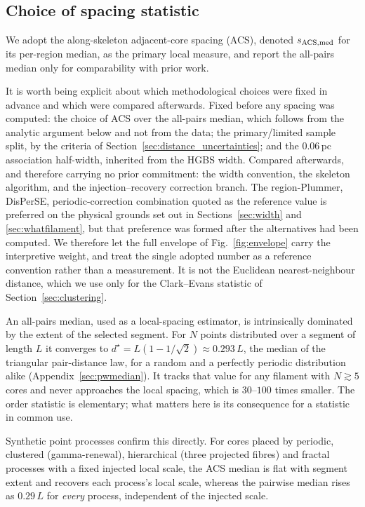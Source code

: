 \documentclass[usenatbib,twoside,twocolumn]{mnras}
\begin{document}
\subsection{Choice of spacing statistic}
\label{sec:statistics}

We adopt the along-skeleton adjacent-core spacing (ACS), denoted $s_{\rm ACS,med}$ for its per-region median, as the primary local measure, and report the all-pairs median only for comparability with prior work.

It is worth being explicit about which methodological choices were fixed in advance and which were compared afterwards. Fixed before any spacing was computed: the choice of ACS over the all-pairs median, which follows from the analytic argument below and not from the data; the primary/limited sample split, by the criteria of Section~\ref{sec:distance_uncertainties}; and the $0.06$\,pc association half-width, inherited from the HGBS width. Compared afterwards, and therefore carrying no prior commitment: the width convention, the skeleton algorithm, and the injection--recovery correction branch. The region-Plummer, DisPerSE, periodic-correction combination quoted as the reference value is preferred on the physical grounds set out in Sections~\ref{sec:width} and \ref{sec:whatfilament}, but that preference was formed after the alternatives had been computed. We therefore let the full envelope of Fig.~\ref{fig:envelope} carry the interpretive weight, and treat the single adopted number as a reference convention rather than a measurement. It is not the Euclidean nearest-neighbour distance, which we use only for the Clark--Evans statistic of Section~\ref{sec:clustering}.

An all-pairs median, used as a local-spacing estimator, is intrinsically dominated by the extent of the selected segment. For $N$ points distributed over a segment of length $L$ it converges to $d^\star=L(1-1/\sqrt{2})\approx0.293\,L$, the median of the triangular pair-distance law, for a random and a perfectly periodic distribution alike (Appendix~\ref{sec:pwmedian}). It tracks that value for any filament with $N\gtrsim5$ cores and never approaches the local spacing, which is $30$--$100$ times smaller. The order statistic is elementary; what matters here is its consequence for a statistic in common use.

Synthetic point processes confirm this directly. For cores placed by periodic, clustered (gamma-renewal), hierarchical (three projected fibres) and fractal processes with a fixed injected local scale, the ACS median is flat with segment extent and recovers each process's local scale, whereas the pairwise median rises as $0.29\,L$ for \emph{every} process, independent of the injected scale.
\end{document}
